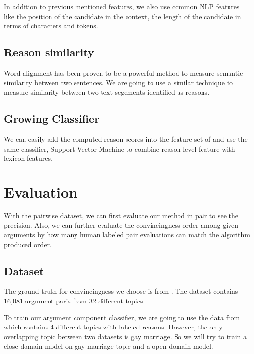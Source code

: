 \documentclass[11pt,a4paper]{article}
\begin{document}
In addition to previous mentioned features, we also use common NLP features like the position of the candidate in the context, the length of the candidate in terms of characters and tokens.





\subsection{Reason similarity}

Word alignment has been proven to be a powerful method to measure semantic similarity between two sentences\cite{sultan2015dls}. We are going to use a similar technique to measure similarity between two text segements identified as reasons.

\subsection{Growing Classifier}

We can easily add the computed reason scores into the feature set of \cite{habernal2016argument} and use the same classifier, Support Vector Machine to combine reason level feature with lexicon features. 




\section{Evaluation}
\label{sec:evaluation}

With the pairwise dataset, we can first evaluate our method in pair to see the precision. Also, we can further evaluate the convincingness order among given arguments by how many human labeled pair evaluations can match the algorithm produced order. 

\subsection{Dataset}

The ground truth for convincingness we choose is from \cite{habernal2016argument}. The dataset contains 16,081 argument paris from 32 different topics. 

To train our argument component classifier, we are going to use the data from \cite{hasan2014you} which contains 4 different topics with labeled reasons. However, the only overlapping topic between two datasets is gay marriage. So we will try to train a close-domain model on gay marriage topic and a open-domain model. 
\end{document}
